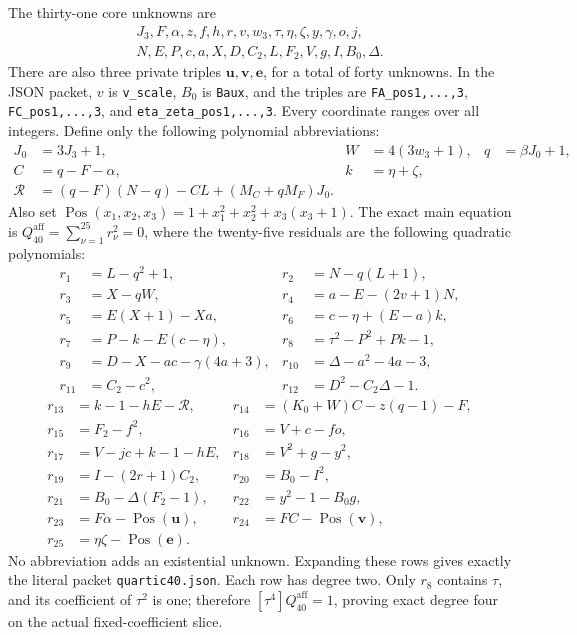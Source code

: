 The thirty-one core unknowns are
\[
\begin{gathered}
J_3,F,\alpha,z,f,h,r,v,w_3,\tau,\eta,\zeta,y,\gamma,o,j,\\
N,E,P,c,a,X,D,C_2,L,F_2,V,g,I,B_0,\Delta.
\end{gathered}
\]
There are also three private triples $\mathbf u,\mathbf v,\mathbf e$,
for a total of forty unknowns.  In the JSON packet, $v$ is
\texttt{v\_scale}, $B_0$ is \texttt{Baux}, and the triples are
\texttt{FA\_pos1,...,3}, \texttt{FC\_pos1,...,3}, and
\texttt{eta\_zeta\_pos1,...,3}.  Every coordinate ranges over all integers.
Define only the following polynomial abbreviations:
\begin{align*}
 J_0&=3J_3+1,& W&=4(3w_3+1),&q&=\beta J_0+1,\\
 C&=q-F-\alpha,& k&=\eta+\zeta,\\
 \mathcal R&=(q-F)(N-q)-CL+(M_C+qM_F)J_0.
\end{align*}
Also set $\operatorname{Pos}(x_1,x_2,x_3)=1+x_1^2+x_2^2+x_3(x_3+1)$.
The exact main equation is $Q_{40}^{\mathrm{aff}}=\sum_{\nu=1}^{25}r_\nu^2=0$,
where the twenty-five residuals are the following quadratic polynomials:
\begin{align*}
 r_1&=L-q^2+1,                         &r_2&=N-q(L+1),\\
 r_3&=X-qW,                           &r_4&=a-E-(2v+1)N,\\
 r_5&=E(X+1)-Xa,                      &r_6&=c-\eta+(E-a)k,\\
 r_7&=P-k-E(c-\eta),                  &r_8&=\tau^2-P^2+Pk-1,\\
 r_9&=D-X-ac-\gamma(4a+3),            &r_{10}&=\Delta-a^2-4a-3,\\
 r_{11}&=C_2-c^2,                     &r_{12}&=D^2-C_2\Delta-1.
\end{align*}
\begin{align*}
 r_{13}&=k-1-hE-\mathcal R,
   &r_{14}&=(K_0+W)C-z(q-1)-F,\\
 r_{15}&=F_2-f^2,
   &r_{16}&=V+c-fo,\\
 r_{17}&=V-jc+k-1-hE,
   &r_{18}&=V^2+g-y^2,\\
 r_{19}&=I-(2r+1)C_2,
   &r_{20}&=B_0-I^2,\\
 r_{21}&=B_0-\Delta(F_2-1),
   &r_{22}&=y^2-1-B_0g,\\
 r_{23}&=F\alpha-\operatorname{Pos}(\mathbf u),
   &r_{24}&=FC-\operatorname{Pos}(\mathbf v),\\
 r_{25}&=\eta\zeta-\operatorname{Pos}(\mathbf e).
\end{align*}
No abbreviation adds an existential unknown.  Expanding these rows gives
exactly the literal packet \texttt{quartic40.json}.  Each row has degree
two.  Only $r_8$ contains $\tau$, and its coefficient of $\tau^2$ is one;
therefore $[\tau^4]Q_{40}^{\mathrm{aff}}=1$, proving exact degree four on the actual
fixed-coefficient slice.

